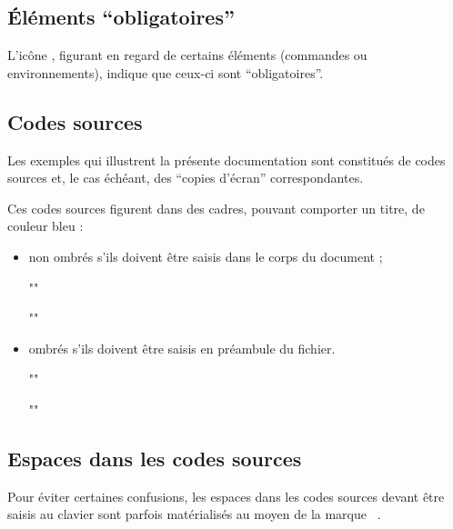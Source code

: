 \documentclass[english,nolocaltoc]{nwejmart}
\newtheorem[style=definition]{fait}
\newtheorem[title=expérience]{experience}
\newtheorem[title-plural=anneaux]{anneau}
\newtheorem[title=idéal,title-plural=idéaux]{ideal}
\begin{document}
\subsection{Éléments \enquote{obligatoires}}
\label{sec-comm-oblig}

L'icône \mandatory{}, figurant en regard de certains éléments (commandes ou
environnements), indique que ceux-ci sont \enquote{obligatoires}.

\subsection{Codes sources}
\label{sec-codes-sources}

Les exemples qui illustrent la présente documentation sont constitués de codes
sources et, le cas échéant, des \enquote{copies d'écran} correspondantes.

Ces codes sources figurent dans des cadres, pouvant comporter un titre, de
couleur bleu :
\begin{itemize}
\item non ombrés s'ils doivent être saisis dans le corps du document ;
\begin{bodycode}
""
\end{bodycode}
\begin{bodycode}[title=\meta{titre}]
""
\end{bodycode}
\item ombrés s'ils doivent être saisis en préambule du fichier.
\begin{preamblecode}
""
\end{preamblecode}
\begin{preamblecode}[title=\meta{titre}]
""
\end{preamblecode}
\end{itemize}

\subsection{Espaces dans les codes sources}
\label{sec-espaces-dans-les}

Pour éviter certaines confusions, les espaces dans les codes sources devant
être saisis au clavier sont parfois matérialisés au moyen de la marque
\lstinline[showspaces]+ +.
\end{document}
